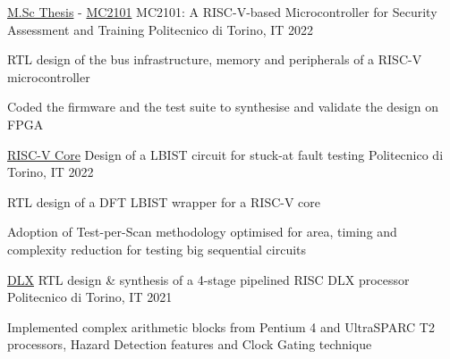 

\begin{cventries}

  \cventry
    {\href{https://github.com/Luca-Dalmasso/Thesis}{{\faGithubSquare} M.Sc Thesis} - \href{https://github.com/Luca-Dalmasso/mc2101}{{\faGithubSquare} MC2101}} %
    {MC2101: A RISC-V-based Microcontroller for Security Assessment and Training} %
    {Politecnico di Torino, IT} %
    {2022} %
    {
      \begin{cvitems} %
        \item{RTL design of the bus infrastructure, memory and peripherals of a RISC-V microcontroller}
        \item{Coded the firmware and the test suite to synthesise and validate the design on FPGA}
      \end{cvitems}
    }
    
  \cventry
    {\href{https://github.com/Luca-Dalmasso/RISCV_LBIST}{{\faGithubSquare} RISC-V Core}} %
    {Design of a LBIST circuit for stuck-at fault testing} %
    {Politecnico di Torino, IT} %
    {2022} %
    {
      \begin{cvitems} %
        \item{RTL design of a DFT LBIST wrapper for a RISC-V core}
        \item{Adoption of Test-per-Scan methodology optimised for area, timing and complexity reduction for testing big sequential circuits}
      \end{cvitems}
    }

  \cventry
    {\href{https://github.com/Luca-Dalmasso/DLX}{{\faGithubSquare} DLX}} %
    {RTL design \& synthesis of a 4-stage pipelined RISC DLX processor} %
    {Politecnico di Torino, IT} %
    {2021} %
    {
      \begin{cvitems} %
        \item{Implemented complex arithmetic blocks from Pentium 4 and UltraSPARC T2 processors, Hazard Detection features and Clock Gating technique}
      \end{cvitems}
    }

\end{cventries}
